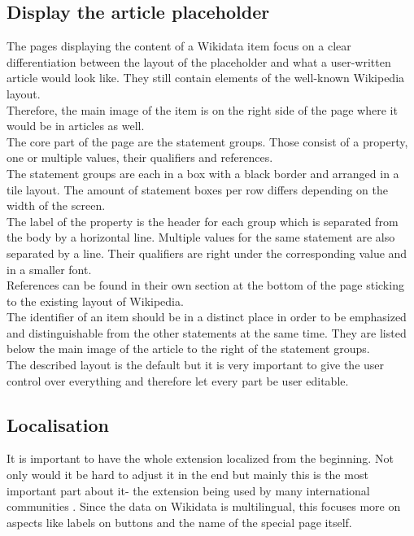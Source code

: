 \subsection{Display the article placeholder}
The pages displaying the content of a Wikidata item focus on a clear differentiation between the layout of the placeholder and what a user-written article would look like. They still contain elements of the well-known Wikipedia layout. \\
Therefore, the main image of the item is on the right side of the page where it would be in articles as well.\\
The core part of the page are the statement groups. Those consist of a property, one or multiple values, their qualifiers and references. \\
The statement groups are each in a box with a black border and arranged in a tile layout. The amount of statement boxes per row differs depending on the width of the screen. \\
The label of the property is the header for each group which is separated from the body by a horizontal line. Multiple values for the same statement are also separated by a line. Their qualifiers are right under the corresponding value and in a smaller font. \\
References can be found in their own section at the bottom of the page sticking to the existing layout of Wikipedia. \\
The identifier of an item should be in a distinct place in order to be emphasized and distinguishable from the other statements at the same time. They are listed below the main image of the article to the right of the statement groups. \\
The described layout is the default but it is very important to give the user control over everything and therefore let every part be user editable. \\

\subsection{Localisation}
It is important to have the whole extension localized from the beginning. Not only would it be hard to adjust it in the end but mainly this is the most important part about it- the extension being used by many international communities%
. Since the data on Wikidata is multilingual, this focuses more on aspects like labels on buttons and the name of the special page itself. \\

